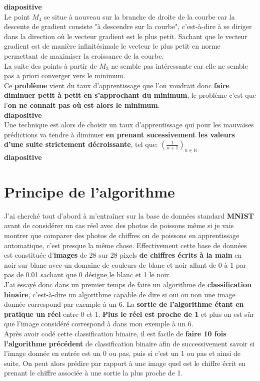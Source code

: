 \documentclass{article}
\begin{document}
	\textbf{diapositive}\\
				
		Le point $M_4$ se situe à nouveau sur la branche de droite de la courbe car la descente de gradient consiste "à descendre sur la courbe", c'est-à-dire à se diriger dans la direction où le vecteur gradient est le plus petit. Sachant que le vecteur gradient est de manière infinitésimale le vecteur le plus petit en norme permettant de maximiser la croissance de la courbe.\\
		La suite des points à partir de $M_3$ ne semble pas intéressante car elle ne semble pas a priori converger vers le minimum.\\
	
		Ce \textbf{problème} vient du taux d'apprentissage que l'on voudrait donc \textbf{faire diminuer petit à petit en s'approchant du minimum}, le problème c'est que l'\textbf{on ne connait pas où est alors le minimum}.\\
		
		\textbf{diapositive}\\
		
		Une technique est alors de choisir un taux d'apprentissage qui pour les mauvaises prédictions va tendre à diminuer \textbf{en prenant sucessivement les valeurs d'une suite strictement décroissante}, tel que: $\left(\frac{1}{n + 1}\right)_{n \in \mathbb{N}}$\\
		
		\textbf{diapositive}\\
		
	\section{Principe de l'algorithme}
	
		J'ai cherché tout d'abord à m'entraîner sur la base de données standard \textbf{MNIST} avant de considérer un cas réel avec des photos de poissons même si je vais montrer que comparer des photos de chiffres ou de poissons en apprentissage automatique, c'est presque la même chose. Effectivement cette base de données est constituée d'\textbf{images} de 28 sur 28 pixels \textbf{de chiffres écrits à la main} en noir sur blanc avec un domaine de couleurs de blanc et noir allant de 0 à 1 par pas de 0.01 sachant que 0 désigne le blanc et 1 le noir.\\
		J'ai essayé donc dans un premier temps de faire un algorithme de \textbf{classification binaire}, c'est-à-dire un algorithme capable de dire si oui ou non une image donnée correspond par exemple à un 6. La \textbf{sortie de l'algorithme étant en pratique un réel} entre 0 et 1. \textbf{Plus le réel est proche de 1} et plus on est sûr que l'image considéré correspond à dans mon exemple à un 6.\\
		Après avoir codé cette classification binaire, il est facile de \textbf{faire 10 fois l'algorithme précédent} de classification binaire afin de successivement savoir si l'image donnée en entrée est un 0 ou pas, puis si c'est un 1 ou pas et ainsi de suite. On peut alors prédire par rapport à une image quel est le chiffre écrit en prenant le chiffre associée à une sortie la plus proche de 1.\\
	
\end{document}
